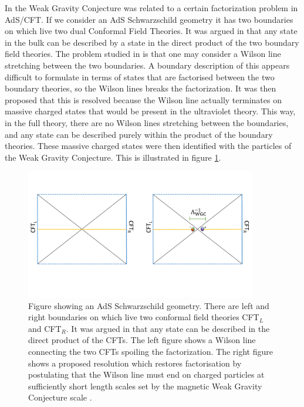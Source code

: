 \documentclass[11pt,a4paper]{article}
\numberwithin{equation}{section}
\numberwithin{table}{section}\setlength{\multlinegap}{25pt}
\begin{document}
In \cite{Harlow:2015lma,Harlow:2018tng,Harlow:2018jwu} the Weak Gravity Conjecture was related to a certain factorization problem in AdS/CFT. If we consider an AdS Schwarzschild geometry it has two boundaries on which live two dual Conformal Field Theories. It was argued in \cite{Maldacena:2001kr} that any state in the bulk can be described by a state in the direct product of the two boundary field theories. The problem studied in \cite{Harlow:2015lma} is that one may consider a Wilson line stretching between the two boundaries. A boundary description of this appears difficult to formulate in terms of states that are factorised between the two boundary theories, so the Wilson lines breaks the factorization. It was then proposed that this is resolved because the Wilson line actually terminates on massive charged states that would be present in the ultraviolet theory. This way, in the full theory, there are no Wilson lines stretching between the boundaries, and any state can be described purely within the product of the boundary theories. These massive charged states were then identified with the particles of the Weak Gravity Conjecture. This is illustrated in figure \ref{fig:adssch}.
\begin{figure}[t]
\centering
 \includegraphics[width=0.9\textwidth]{adssch.pdf}
\caption{Figure showing an AdS Schwarzschild geometry. There are left and right boundaries on which live two conformal field theories CFT$_L$ and CFT$_R$. It was argued in \cite{Maldacena:2001kr} that any state can be described in the direct product of the CFTs. The left figure shows a Wilson line connecting the two CFTs spoiling the factorization. The right figure shows a proposed resolution which restores factorisation by postulating that the Wilson line must end on charged particles at sufficiently short length scales set by the magnetic Weak Gravity Conjecture scale \cite{Harlow:2015lma}.}
\label{fig:adssch}
\end{figure}
\end{document}
